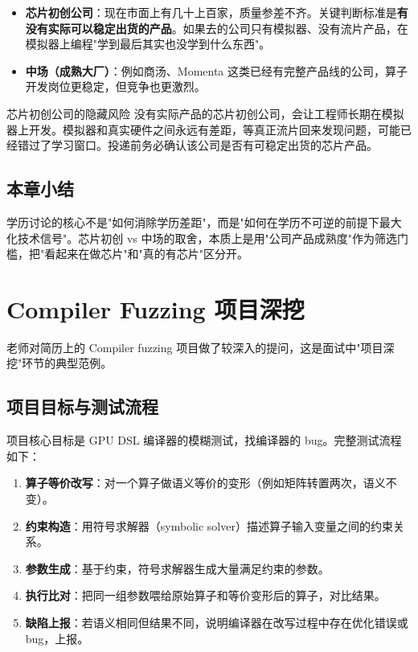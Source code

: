 \documentclass[a4paper]{article}
\begin{document}
\begin{itemize}
\item \textbf{芯片初创公司}：现在市面上有几十上百家，质量参差不齐。关键判断标准是\textbf{有没有实际可以稳定出货的产品}。如果去的公司只有模拟器、没有流片产品，在模拟器上编程"学到最后其实也没学到什么东西"。
\item \textbf{中场（成熟大厂）}：例如商汤、Momenta 这类已经有完整产品线的公司，算子开发岗位更稳定，但竞争也更激烈。
\end{itemize}

\begin{warningbox}{芯片初创公司的隐藏风险}
没有实际产品的芯片初创公司，会让工程师长期在模拟器上开发。模拟器和真实硬件之间永远有差距，等真正流片回来发现问题，可能已经错过了学习窗口。投递前务必确认该公司是否有可稳定出货的芯片产品。
\end{warningbox}

\subsection{本章小结}

学历讨论的核心不是"如何消除学历差距"，而是"如何在学历不可逆的前提下最大化技术信号"。芯片初创 vs 中场的取舍，本质上是用"公司产品成熟度"作为筛选门槛，把"看起来在做芯片"和"真的有芯片"区分开。

\section{Compiler Fuzzing 项目深挖}

老师对简历上的 Compiler fuzzing 项目做了较深入的提问，这是面试中"项目深挖"环节的典型范例。

\subsection{项目目标与测试流程}

项目核心目标是 GPU DSL 编译器的模糊测试，找编译器的 bug。完整测试流程如下：

\begin{enumerate}
\item \textbf{算子等价改写}：对一个算子做语义等价的变形（例如矩阵转置两次，语义不变）。
\item \textbf{约束构造}：用符号求解器（symbolic solver）描述算子输入变量之间的约束关系。
\item \textbf{参数生成}：基于约束，符号求解器生成大量满足约束的参数。
\item \textbf{执行比对}：把同一组参数喂给原始算子和等价变形后的算子，对比结果。
\item \textbf{缺陷上报}：若语义相同但结果不同，说明编译器在改写过程中存在优化错误或 bug，上报。
\end{enumerate}
\end{document}
